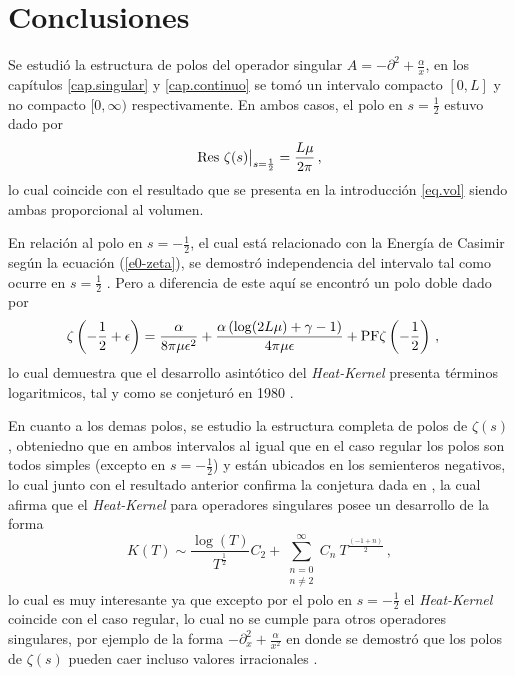 \chapter{Conclusiones}

Se estudió la estructura de polos del operador singular $A = - \partial ^2 + \frac{\alpha}{x} $, 
en los capítulos \ref{cap.singular} y \ref{cap.continuo} se tomó un intervalo compacto $[0,L]$ y no compacto $[0, \infty)$ respectivamente.
En ambos casos, el polo en $s = \frac{1}{2}$ estuvo dado por
\begin{equation}
{\rm Res } \ \zeta (s) \big|_{s = \frac{1}{2}}
= \frac{L \mu}{2 \pi}
\, ,
\end{equation}
lo cual coincide con el resultado que se presenta en la introducción \eqref{eq.vol} siendo ambas proporcional al volumen.

En relación al polo en $s= -\frac{1}{2}$, el cual está relacionado con la Energía de Casimir según la ecuación (\ref{e0-zeta}), se demostró independencia del intervalo tal como ocurre en $s= \frac{1}{2}$ . Pero a diferencia de este aquí se encontró un polo doble dado por
\begin{align*}
&
	\zeta \left( - \frac{1}{2} + \epsilon \right) = 
	\frac{\alpha}{8 \pi \mu  \epsilon  ^2} +
	\frac{\alpha \left( \log (2 L \mu ) + \gamma -1  \right)}{4 \pi \mu  \epsilon } +
	{\rm PF } \zeta \left( - \frac{1}{2} \right)
\, ,
\end{align*}
lo cual demuestra que el desarrollo asintótico del {\it Heat-Kernel} presenta términos logaritmicos, tal y como se conjeturó en 1980 \cite{Callias1980}.


En cuanto a los demas polos, se estudio la estructura completa de polos de $\zeta \left(s \right)$, obteniedno que en ambos intervalos al igual que en el caso regular los polos son todos simples (excepto en $s= - \frac{1}{2}$) y están ubicados en los semienteros negativos, lo cual junto con el resultado anterior confirma la conjetura dada en \cite{Callias1980}, la cual afirma que el {\it Heat-Kernel} para operadores singulares posee un desarrollo de la forma  
\begin{equation}
	K(T) \sim 
	\frac{ \log (T)}{T ^{\frac{1}{2} }} C _{2} +
	\sum _{\substack{n=0 \\ n \neq 2}} ^{\infty}
	C _n  \ 
	T^{\frac{(-1+n)}{2}} 
\, ,
\end{equation}
lo cual es muy interesante ya que excepto por el polo en $s = - \frac{1}{2}$ el {\it Heat-Kernel} coincide con el caso regular, lo cual no se cumple para otros operadores singulares, por ejemplo de la forma $- \partial ^2 _x + \frac{\alpha}{x ^2}$ en donde se demostró que los polos de $\zeta (s)$ pueden caer incluso valores irracionales \cite{doi:10.1063/1.1809257}.



